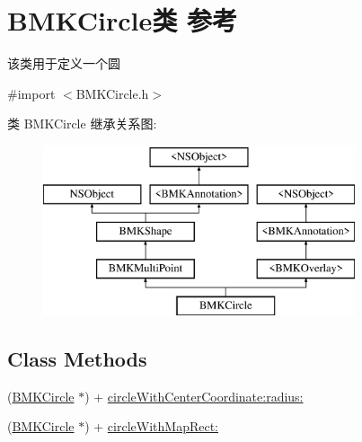 \hypertarget{interface_b_m_k_circle}{}\section{B\+M\+K\+Circle类 参考}
\label{interface_b_m_k_circle}


该类用于定义一个圆  




{\ttfamily \#import $<$B\+M\+K\+Circle.\+h$>$}

类 B\+M\+K\+Circle 继承关系图\+:\begin{figure}[H]
\begin{center}
\leavevmode
\includegraphics[height=5.000000cm]{interface_b_m_k_circle}
\end{center}
\end{figure}
\subsection*{Class Methods}
\begin{DoxyCompactItemize}
\item 
(\hyperlink{interface_b_m_k_circle}{B\+M\+K\+Circle} $\ast$) + \hyperlink{interface_b_m_k_circle_a82a7234e92fda719b74d6055ee30d360}{circle\+With\+Center\+Coordinate\+:radius\+:}
\item 
(\hyperlink{interface_b_m_k_circle}{B\+M\+K\+Circle} $\ast$) + \hyperlink{interface_b_m_k_circle_af4109f36f784b80a758a0b48c636e4a7}{circle\+With\+Map\+Rect\+:}
\end{DoxyCompactItemize}
